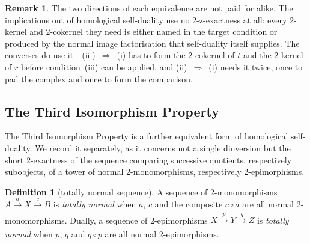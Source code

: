 \documentclass[reqno,a4paper]{amsart}
\numberwithin{equation}{section}
\theoremstyle{plain}
\theoremstyle{definition}
\newtheorem{definition}[subsection]{Definition}
\newtheorem{remark}[subsection]{Remark}
\def\dfn#1{{\itshape #1}}
\newcommand{\comp}{\circ}
\renewcommand{\1}{\onecat{1}}
\newcommand{\aar}[2][]{\xrightarrow[#1]{#2}}
\begin{document}
\begin{remark}\label{Rem HSD Cost}
	The two directions of each equivalence are not paid for alike. The implications out of homological self-duality use no 2-z-exactness at all: every 2-kernel and 2-cokernel they need is either named in the target condition or produced by the normal image factorisation that self-duality itself supplies. The converses do use it---\mbox{(iii)~\(\Rightarrow\)~(i)} has to form the 2-cokernel of \(t\) and the 2-kernel of \(r\) before condition~(iii) can be applied, and \mbox{(ii)~\(\Rightarrow\)~(i)} needs it twice, once to pad the complex and once to form the comparison.
\end{remark}

\subsection{The Third Isomorphism Property}\label{SS:ThirdIso}

The Third Isomorphism Property is a further equivalent form of homological self-duality. We record it separately, as it concerns not a single dinversion but the short 2-exactness of the sequence comparing successive quotients, respectively subobjects, of a tower of normal 2-monomorphisms, respectively 2-epimorphisms.

\begin{definition}[totally normal sequence]\label{Def:TotallyNormal}
	A sequence of 2-monomorphisms \(A\aar{a}X\aar{c}B\) is \dfn{totally normal} when \(a\), \(c\) and the composite \(c\comp a\) are all normal 2-monomorphisms. Dually, a sequence of 2-epimorphisms \(X\aar{p}Y\aar{q}Z\) is \dfn{totally normal} when \(p\), \(q\) and \(q\comp p\) are all normal 2-epimorphisms.
\end{definition}
\end{document}

